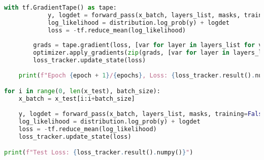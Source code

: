 \begin{lstlisting}[language=Python]
        with tf.GradientTape() as tape:
            y, logdet = forward_pass(x_batch, layers_list, masks, training=True)
            log_likelihood = distribution.log_prob(y) + logdet
            loss = -tf.reduce_mean(log_likelihood)
        
        grads = tape.gradient(loss, [var for layer in layers_list for var in layer.trainable_variables])
        optimizer.apply_gradients(zip(grads, [var for layer in layers_list for var in layer.trainable_variables]))
        loss_tracker.update_state(loss)
    
    print(f"Epoch {epoch + 1}/{epochs}, Loss: {loss_tracker.result().numpy()}")

for i in range(0, len(x_test), batch_size):
    x_batch = x_test[i:i+batch_size]
    
    y, logdet = forward_pass(x_batch, layers_list, masks, training=False)
    log_likelihood = distribution.log_prob(y) + logdet
    loss = -tf.reduce_mean(log_likelihood)
    loss_tracker.update_state(loss)

print(f"Test Loss: {loss_tracker.result().numpy()}")
\end{lstlisting}

\newpage